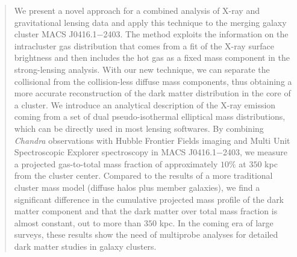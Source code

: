 \documentclass[twocolumn]{aastex61}
\begin{document}
\begin{abstract}
We present a novel approach for a combined analysis of X-ray and gravitational
lensing data and apply this technique to the merging galaxy cluster MACS J0416.1$-$2403.
The method exploits the information on the intracluster gas distribution that
comes from a fit of the X-ray surface brightness and then includes the hot gas
as a fixed mass component in the strong-lensing analysis.
With our new technique, we can separate the collisional from the collision-less
diffuse mass components, thus obtaining a more accurate reconstruction of the
dark matter distribution in the core of a cluster.
We introduce an analytical description of the X-ray emission coming from a set
of dual pseudo-isothermal elliptical mass distributions,
which can be directly used in most lensing softwares.
By combining \emph{Chandra} observations with Hubble Frontier Fields imaging and
Multi Unit Spectroscopic Explorer spectroscopy in MACS J0416.1$-$2403, we measure a projected gas-to-total
mass fraction of approximately $10\%$ at $350$ kpc from the cluster center.
Compared to the results of a more traditional cluster mass model (diffuse halos
plus member galaxies), we find a significant difference in the cumulative
projected mass profile of the dark matter component and that the dark matter over
total mass fraction is almost constant, out to more than $350$ kpc.
In the coming era of large surveys, these results show the need of multiprobe
analyses for detailed dark matter studies in galaxy clusters.
\end{abstract}

\end{document}
